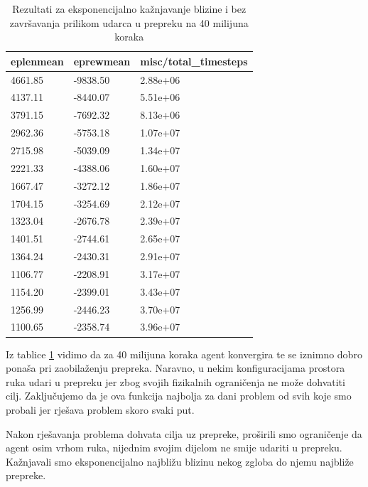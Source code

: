 \documentclass[times,utf8,diplomski]{fer}
\begin{document}
\begin{table}[ht!]
\centering
\caption{Rezultati za eksponencijalno kažnjavanje blizine i bez završavanja prilikom udarca u prepreku na 40 milijuna koraka}
\label{tab:cetm}
\begin{tabular}{@{}lll@{}}
\hline
eplenmean & eprewmean & misc/total\_timesteps \\
\hline
\hline
4661.85 & -9838.50 & 2.88e+06 \\ 
4137.11 & -8440.07 & 5.51e+06 \\ 
3791.15 & -7692.32 & 8.13e+06 \\ 
2962.36 & -5753.18 & 1.07e+07 \\ 
2715.98 & -5039.09 & 1.34e+07 \\ 
2221.33 & -4388.06 & 1.60e+07 \\ 
1667.47 & -3272.12 & 1.86e+07 \\ 
1704.15 & -3254.69 & 2.12e+07 \\ 
1323.04 & -2676.78 & 2.39e+07 \\ 
1401.51 & -2744.61 & 2.65e+07 \\ 
1364.24 & -2430.31 & 2.91e+07 \\ 
1106.77 & -2208.91 & 3.17e+07 \\ 
1154.20 & -2399.01 & 3.43e+07 \\ 
1256.99 & -2446.23 & 3.70e+07 \\ 
1100.65 & -2358.74 & 3.96e+07 \\ 
\hline
\end{tabular}
\end{table}

\vspace{100pt}

Iz tablice \ref{tab:cetm} vidimo da za 40 milijuna koraka agent konvergira te se iznimno dobro ponaša pri zaobilaženju prepreka. Naravno, u nekim konfiguracijama prostora ruka udari u prepreku jer zbog svojih fizikalnih ograničenja ne može dohvatiti cilj. Zaključujemo da je ova funkcija najbolja za dani problem od svih koje smo probali jer rješava problem skoro svaki put.

Nakon rješavanja problema dohvata cilja uz prepreke, proširili smo ograničenje da agent osim vrhom ruka, nijednim svojim dijelom ne smije udariti u prepreku. Kažnjavali smo eksponencijalno najbližu blizinu nekog zgloba do njemu najbliže prepreke.
\end{document}

